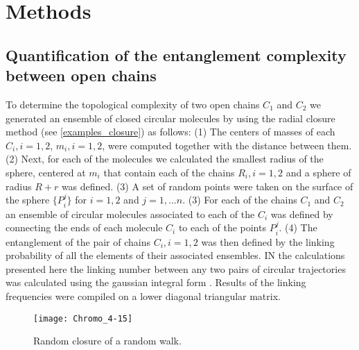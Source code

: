 \documentclass{iopart}
\begin{document}
\section{Methods}

\subsection{Quantification of the entanglement complexity between open chains}
To determine the topological complexity of two open chains $C_1$ and $C_2$ we generated an ensemble of closed circular molecules by using the radial closure method  \cite{Millet2013} (see \ref{examples_closure}) as follows: (1) The centers of masses of each $C_i,i=1,2$, $m_i, i=1,2$, were computed together with the distance between them. (2) Next, for each of the molecules we calculated the smallest radius of the sphere, centered at $m_i$ that contain each of the chains  $R_i,i=1,2$ and a sphere of radius $R+r$ was defined. (3) A set of random points were taken on the surface of the sphere $\{P_i^j\}$ for $i=1,2$ and $j=1,...n$. (3) For each of the chains $C_1$ and $C_2$ an ensemble of circular molecules associated to each of the $C_i$ was defined by connecting the ends of each molecule $C_i$ to each of the points $P_i^j$. (4) The entanglement of the pair of chains $C_i,i=1,2$ was then defined by the linking probability of all the elements of their associated ensembles. IN the calculations presented here the linking number between any two pairs of circular trajectories was  calculated using the gaussian integral form \cite{KL2000}. Results of the linking frequencies were compiled on a lower diagonal triangular matrix. 


\begin{figure}[!htb]
\begin{center}
\texttt{[image: Chromo\_4-15]}
\end{center}
\caption{Random closure of a random walk.
\label{RandomClosure}}
\end{figure}


\medskip


\medskip
\end{document}
